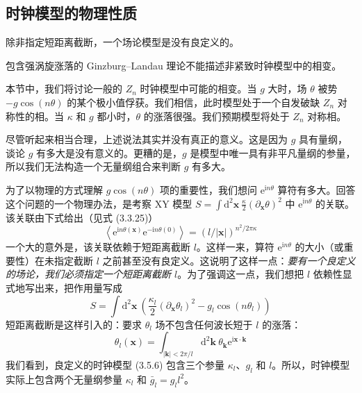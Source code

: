 \subsection{时钟模型的物理性质}
\begin{keypoints}
\item 除非指定短距离截断，一个场论模型是没有良定义的。
\item 包含强涡旋涨落的 Ginzburg--Landau 理论不能描述非紧致时钟模型中的相变。
\end{keypoints}

本节中，我们将讨论一般的 $Z_{n}$ 时钟模型中可能的相变。当 $g$ 大时，场 $\theta$ 被势 $-g\cos(n\theta)$ 的某个极小值俘获。我们相信，此时模型处于一个自发破缺 $Z_{n}$ 对称性的相。当 $\kappa$ 和 $g$ 都小时，$\theta$ 的涨落很强。我们预期模型将处于 $Z_{n}$ 对称相。

尽管听起来相当合理，上述说法其实并没有真正的意义。这是因为 $g$ 具有量纲，谈论 $g$ 有多大是没有意义的。更糟的是，$g$ 是模型中唯一具有非平凡量纲的参量，所以我们无法构造一个无量纲组合来判断 $g$ 有多大。

为了以物理的方式理解 $g\cos(n\theta)$ 项的重要性，我们想问 $\mathrm{e}^{\mathrm{i}n\theta}$ 算符有多大。回答这个问题的一个物理办法，是考察 XY 模型 $S = \int \mathrm{d}^{2}\pmb{x}\ \frac{\kappa}{2}(\partial_{\pmb{x}}\theta)^{2}$ 中 $\mathrm{e}^{\mathrm{i}n\theta}$ 的关联。该关联由下式给出（见式 (3.3.25)）
\begin{equation*}
\left\langle \mathrm{e}^{\mathrm{i}n\theta(\pmb{x})}\mathrm{e}^{-\mathrm{i}n\theta(0)} \right\rangle = (l/|\pmb{x}|)^{n^{2}/2\pi\kappa}
\tag{3.5.5}
\end{equation*}
一个大的意外是，该关联依赖于短距离截断 $l$。这样一来，算符 $\mathrm{e}^{\mathrm{i}n\theta}$ 的大小（或重要性）在未指定截断 $l$ 之前甚至没有良定义。这说明了这样一点：\emph{要有一个良定义的场论，我们必须指定一个短距离截断 $l$}。为了强调这一点，我们想把 $l$ 依赖性显式地写出来，把作用量写成
\begin{equation*}
S = \int \mathrm{d}^{2}\pmb{x}\ \left( \frac{\kappa_{l}}{2}(\partial_{\pmb{x}}\theta_{l})^{2} - g_{l}\cos(n\theta_{l}) \right)
\tag{3.5.6}
\end{equation*}
短距离截断是这样引入的：要求 $\theta_{l}$ 场不包含任何波长短于 $l$ 的涨落：
\begin{equation*}
\theta_{l}(\pmb{x}) = \int_{|\pmb{k}|<2\pi/l} \mathrm{d}^{2}\pmb{k}\ \theta_{\pmb{k}}\mathrm{e}^{\mathrm{i}\pmb{x}\cdot\pmb{k}}
\end{equation*}
我们看到，良定义的时钟模型 (3.5.6) 包含三个参量 $\kappa_{l}$、$g_{l}$ 和 $l$。所以，时钟模型实际上包含两个无量纲参量 $\kappa_{l}$ 和 $\bar{g}_{l} = g_{l}l^{2}$。

